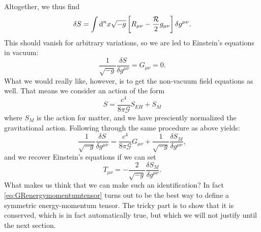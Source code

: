 Altogether, we thus find
\begin{equation}
	\delta S = \int \mathrm{d}^n x \sqrt{-g}  \left[R_{\mu \nu} - \frac{\mathcal{R}}{2} g_{\mu \nu} \right]\delta g^{\mu \nu}.
\end{equation}
This should vanish for arbitrary variations, so we are led to Einstein’s equations in vacuum:
\begin{equation}
	\frac{1}{\sqrt{-g}} \frac{\delta S}{\delta g^{\mu \nu}} = G_{\mu \nu} =0.
\end{equation}
What we would really like, however, is to get the non-vacuum field equations
as well. That means we consider an action of the form
\begin{equation}
	S = \frac{c^4}{8 \pi \mathcal{G}} S_{EH} + S_M
\end{equation}
where $S_M$ is the action for matter, and we have presciently normalized the gravitational
action. Following through the same procedure as above yields:
\begin{equation}
		\frac{1}{\sqrt{-g}} \frac{\delta S}{\delta g^{\mu \nu}} = \frac{c^4}{8 \pi \mathcal{G}} G_{\mu \nu} + \frac{1}{\sqrt{-g}} \frac{\delta S_M}{\delta g^{\mu \nu}},
\end{equation}
and we recover Einstein’s equations if we can set
\begin{equation}
\label{eq:GRenergymomentumtensor}
	T_{\mu \nu} = - \frac{2}{\sqrt{-g}} \frac{\delta S_M}{\delta g^{\mu \nu}}.
\end{equation}
What makes us think that we can make such an identification? In fact \ref{eq:GRenergymomentumtensor} turns out to
be the best way to define a symmetric energy-momentum tensor. The tricky part is to show
that it is conserved, which is in fact automatically true, but which we will not justify until
the next section.
